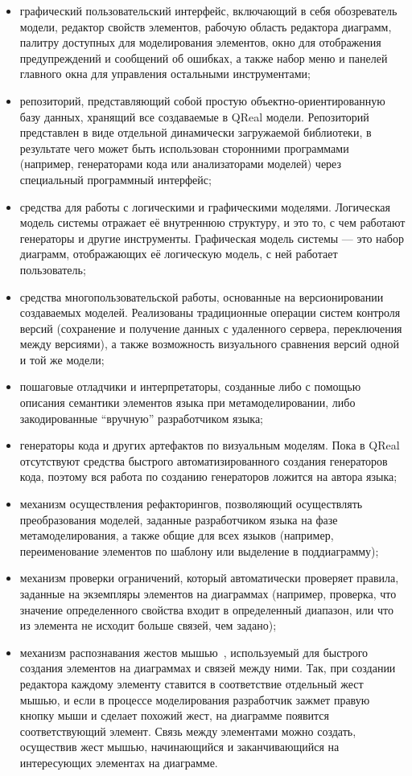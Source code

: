 \documentclass[a4, 12pt]{article}
\begin{document}
\begin{itemize}
\item графический пользовательский интерфейс, включающий в себя обозреватель модели, редактор свойств элементов, рабочую область редактора диаграмм, палитру доступных для моделирования элементов, окно для отображения предупреждений и сообщений об ошибках, а также набор меню и панелей главного окна для управления остальными инструментами;
\item репозиторий, представляющий собой простую объектно-ориентированную базу данных, хранящий все создаваемые в QReal модели.  Репозиторий представлен в виде отдельной динамически загружаемой библиотеки, в результате чего может быть использован сторонними программами (например, генераторами кода или анализаторами моделей) через специальный программный интерфейс;
\item средства для работы с логическими и графическими моделями. Логическая модель системы отражает её внутреннюю структуру, и это то, с чем работают генераторы и другие инструменты. Графическая модель системы --- это набор диаграмм, отображающих её логическую модель, с ней работает пользователь;
\item средства многопользовательской работы, основанные на версионировании создаваемых моделей. Реализованы традиционные операции систем контроля версий (сохранение и получение данных с удаленного сервера, переключения между версиями), а также возможность визуального сравнения версий одной и той же модели;
\item пошаговые отладчики и интерпретаторы, созданные либо с помощью описания семантики элементов языка при метамоделировании, либо закодированные ``вручную'' разработчиком языка;
\item генераторы кода и других артефактов по визуальным моделям. Пока в QReal отсутствуют средства быстрого автоматизированного создания генераторов кода, поэтому вся работа по созданию генераторов ложится на автора языка;
\item механизм осуществления рефакторингов, позволяющий осуществлять преобразования моделей, заданные разработчиком языка на фазе метамоделирования, а также общие для всех языков (например, переименование элементов по шаблону или выделение в поддиаграмму);
\item механизм проверки ограничений, который автоматически проверяет правила, заданные на экземпляры элементов на диаграммах (например, проверка, что значение определенного свойства входит в определенный диапазон, или что из элемента не исходит больше связей, чем задано);
\item механизм распознавания жестов мышью~\cite{qreal3}, используемый для быстрого создания элементов на диаграммах и связей между ними. Так, при создании редактора каждому элементу ставится в соответствие отдельный жест мышью, и если в процессе моделирования разработчик зажмет правую кнопку мыши и сделает похожий жест, на диаграмме появится соответствующий элемент. Связь между элементами можно создать, осуществив жест мышью, начинающийся и заканчивающийся на интересующих элементах на диаграмме.
\end{itemize}
\end{document}
